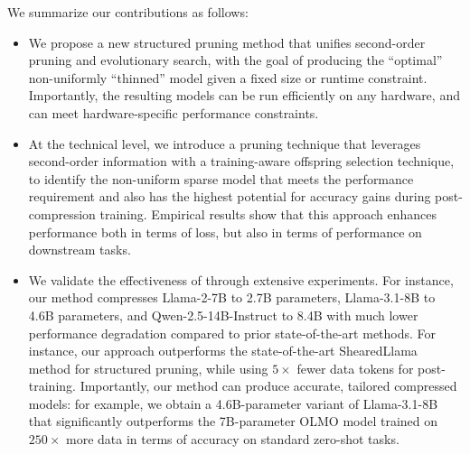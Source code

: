 We summarize our contributions as follows:
\vspace{-0.1in}
\begin{itemize}
\addtolength{\itemsep}{-0.05in}
    \item We propose a new structured pruning method that unifies second-order pruning and evolutionary search, with the goal of producing the ``optimal'' non-uniformly ``thinned'' model given a fixed size or runtime constraint. Importantly, the resulting models can be run efficiently on any hardware, and can meet hardware-specific performance constraints. 
    \item At the technical level, we introduce a pruning technique that leverages second-order information with a training-aware offspring selection technique, to identify the non-uniform sparse model that meets the performance requirement and also has the highest potential for accuracy gains during post-compression training. Empirical results show that this approach enhances performance both in terms of loss, but also in terms of performance on downstream tasks.
    \item We validate the effectiveness of \sysname through extensive experiments. For instance, our method compresses Llama-2-7B to 2.7B parameters, Llama-3.1-8B to 4.6B parameters, and Qwen-2.5-14B-Instruct to 8.4B with much lower performance degradation compared to prior state-of-the-art methods. For instance, our approach outperforms the state-of-the-art ShearedLlama method for structured pruning, while using $5\times$ fewer data tokens for post-training. Importantly, our method can produce accurate, tailored compressed models: for example, we obtain a 4.6B-parameter variant of Llama-3.1-8B that significantly outperforms the 7B-parameter OLMO model trained on $250\times$ more data in terms of accuracy on standard zero-shot tasks.
\end{itemize}